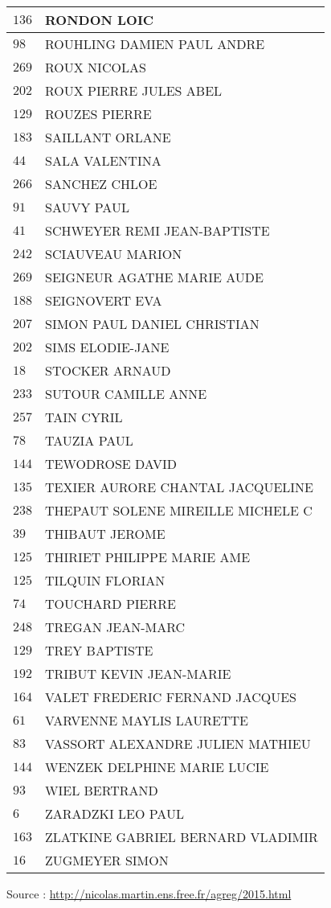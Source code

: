 \begin{xltabular}{\linewidth}{|l|X|}
    \hline
    $136$ & RONDON LOIC \\
    \hline
    $98$ & ROUHLING DAMIEN PAUL ANDRE \\
    \hline
    $269$ & ROUX NICOLAS \\
    \hline
    $202$ & ROUX PIERRE JULES ABEL \\
    \hline
    $129$ & ROUZES PIERRE \\
    \hline
    $183$ & SAILLANT ORLANE \\
    \hline
    $44$ & SALA VALENTINA \\
    \hline
    $266$ & SANCHEZ CHLOE \\
    \hline
    $91$ & SAUVY PAUL \\
    \hline
    $41$ & SCHWEYER REMI JEAN-BAPTISTE \\
    \hline
    $242$ & SCIAUVEAU MARION \\
    \hline
    $269$ & SEIGNEUR AGATHE MARIE AUDE \\
    \hline
    $188$ & SEIGNOVERT EVA \\
    \hline
    $207$ & SIMON PAUL DANIEL CHRISTIAN \\
    \hline
    $202$ & SIMS ELODIE-JANE \\
    \hline
    $18$ & STOCKER ARNAUD \\
    \hline
    $233$ & SUTOUR CAMILLE ANNE \\
    \hline
    $257$ & TAIN CYRIL \\
    \hline
    $78$ & TAUZIA PAUL \\
    \hline
    $144$ & TEWODROSE DAVID \\
    \hline
    $135$ & TEXIER AURORE CHANTAL JACQUELINE \\
    \hline
    $238$ & THEPAUT SOLENE MIREILLE MICHELE C \\
    \hline
    $39$ & THIBAUT JEROME \\
    \hline
    $125$ & THIRIET PHILIPPE MARIE AME \\
    \hline
    $125$ & TILQUIN FLORIAN \\
    \hline
    $74$ & TOUCHARD PIERRE \\
    \hline
    $248$ & TREGAN JEAN-MARC \\
    \hline
    $129$ & TREY BAPTISTE \\
    \hline
    $192$ & TRIBUT KEVIN JEAN-MARIE \\
    \hline
    $164$ & VALET FREDERIC FERNAND JACQUES \\
    \hline
    $61$ & VARVENNE MAYLIS LAURETTE \\
    \hline
    $83$ & VASSORT ALEXANDRE JULIEN MATHIEU \\
    \hline
    $144$ & WENZEK DELPHINE MARIE LUCIE \\
    \hline
    $93$ & WIEL BERTRAND \\
    \hline
    $6$ & ZARADZKI LEO PAUL \\
    \hline
    $163$ & ZLATKINE GABRIEL BERNARD VLADIMIR \\
    \hline
    $16$ & ZUGMEYER SIMON \\
    \hline
  \end{xltabular}

  \begin{flushright}
    {\tiny Source : \url{http://nicolas.martin.ens.free.fr/agreg/2015.html}}
  \end{flushright}


